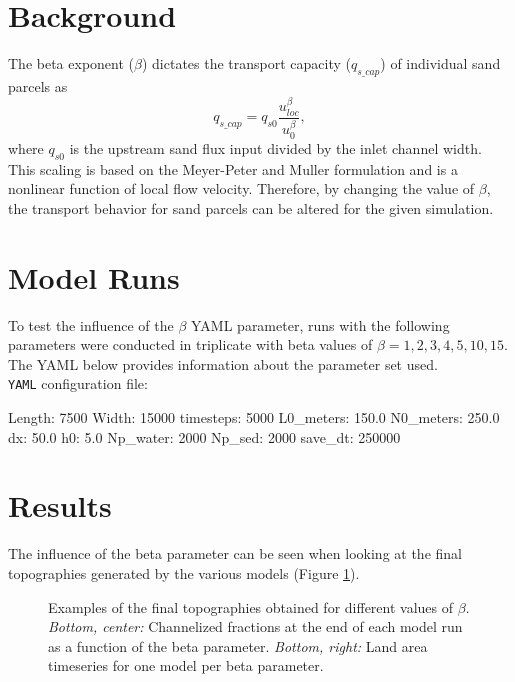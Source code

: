 \section{Background}
The beta exponent ($\beta$) dictates the transport capacity ($q_{s\_{}cap}$) of individual sand parcels as
\begin{equation}
	q_{s\_{}cap} = q_{s0} \frac{u_{loc}^{\beta}}{u_{0}^{\beta}},
\end{equation}
where $q_{s0}$ is the upstream sand flux input divided by the inlet channel width.
This scaling is based on the Meyer-Peter and Muller \citep{meyer1948formulas} formulation and is a nonlinear function of local flow velocity.
Therefore, by changing the value of $\beta$, the transport behavior for sand parcels can be altered for the given simulation.

\section{Model Runs}
To test the influence of the $\beta$ YAML parameter, runs with the following parameters were conducted in triplicate with beta values of $\beta = 1, 2, 3, 4, 5, 10, 15$.
The YAML below provides information about the parameter set used.\\

\noindent \texttt{YAML} configuration file: \vspace{-6pt}
\begin{boxedverbatim}
Length: 7500
Width: 15000
timesteps: 5000
L0_meters: 150.0
N0_meters: 250.0
dx: 50.0
h0: 5.0
Np_water: 2000
Np_sed: 2000
save_dt: 250000
\end{boxedverbatim}

\section{Results}
The influence of the beta parameter can be seen when looking at the final topographies generated by the various models (Figure \ref{fig:beta_topos}).

\begin{figure}
	\caption{Examples of the final topographies obtained for different values of $\beta$. \textit{Bottom, center:} Channelized fractions at the end of each model run as a function of the beta parameter. \textit{Bottom, right:} Land area timeseries for one model per beta parameter.}
	\label{fig:beta_topos}
\end{figure}

